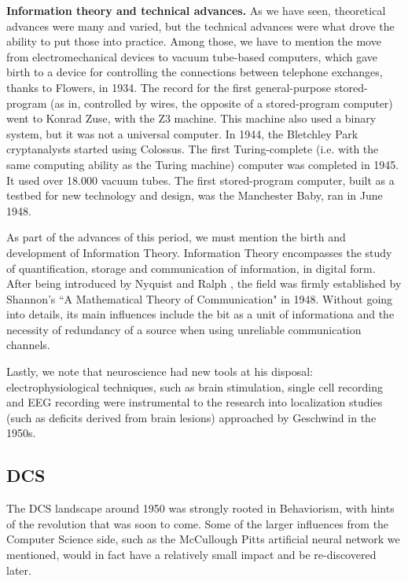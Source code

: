 \documentclass[../main.tex]{subfiles}
\begin{document}
\vspace{4pt}
\textbf{Information theory and technical advances.}
As we have seen, theoretical advances were many and varied, but the technical advances were what drove the ability to put those into practice. Among those, we have to mention the move from electromechanical devices to vacuum tube-based computers, which gave birth to a device for controlling the connections between telephone exchanges, thanks to Flowers, in 1934. The record for the first general-purpose stored-program (as in, controlled by wires, the opposite of a stored-program computer) went to Konrad Zuse, with the Z3 machine. This machine also used a binary system, but it was not a universal computer. In 1944, the Bletchley Park cryptanalysts started using Colossus. The first Turing-complete (i.e. with the same computing ability as the Turing machine) computer was completed in 1945. It used over 18.000 vacuum tubes. The first stored-program computer, built as a testbed for new technology and design, was the Manchester Baby, ran in June 1948\cite{ComputerResurrectionIssue2012}.

As part of the advances of this period, we must mention the birth and development of Information Theory. Information Theory encompasses the study of quantification, storage and communication of information, in digital form. After being introduced by Nyquist and Ralph \cite{nyquistCertainTopicsTelegraph1928}, the field was firmly established by Shannon's ``A Mathematical Theory of Communication" in 1948. Without going into details, its main influences include the bit as a unit of informationa and the necessity of redundancy of a source when using unreliable communication channels.

Lastly, we note that neuroscience had new tools at his disposal: electrophysiological techniques, such as brain stimulation, single cell recording and EEG recording \cite{InternationalEncyclopediaSocial} were instrumental to the research into localization studies (such as deficits derived from brain lesions) approached by Geschwind in the 1950s.

\subsection{DCS}
The DCS landscape around 1950 was strongly rooted in Behaviorism, with hints of the revolution that was soon to come. Some of the larger influences from the Computer Science side, such as the McCullough Pitts artificial neural network we mentioned, would in fact have a relatively small impact and be re-discovered later.
\end{document}
